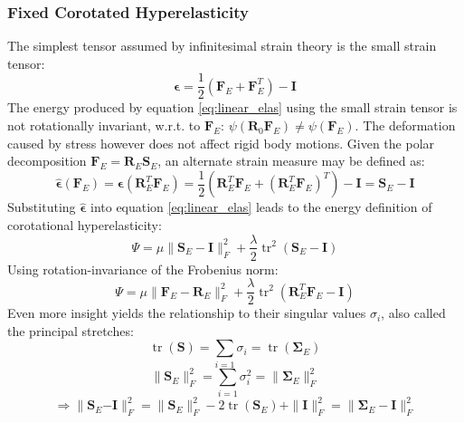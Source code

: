 \documentclass[m,times]{cgMA}
\begin{document}
\subsubsection{Fixed Corotated Hyperelasticity}
The simplest tensor assumed by infinitesimal strain theory is the small strain tensor: \begin{equation}
  \boldsymbol{\epsilon} = \frac { 1 } { 2 } \left( \mathbf { F }_E + \mathbf { F }_E ^ { T } \right) - \mathbf { I }
\end{equation}
The energy produced by equation \ref{eq:linear_elas} using the small strain tensor is not rotationally invariant, w.r.t. to $\mathbf{F}_E$: $\psi(\mathbf{R}_{0} \mathbf{F}_E) \neq \psi(\mathbf{F}_E)$. The deformation caused by stress however does not affect rigid body motions. Given the polar decomposition $\mathbf{F}_E = \mathbf{R}_E\mathbf{S}_E$, an alternate strain measure may be defined as:
\begin{equation}
  \hat { \boldsymbol { \epsilon } } ( \mathbf { F }_E ) = \boldsymbol { \epsilon } \left( \mathbf { R }_E ^ { T } \mathbf { F }_E \right) = \frac { 1 } { 2 } \left( \mathbf { R }_E ^ { T } \mathbf { F }_E + \left( \mathbf { R }_E ^ { T } \mathbf { F }_E \right) ^ { T } \right) - \mathbf { I } = \mathbf { S }_E - \mathbf { I }
\end{equation}
Substituting $\hat{\boldsymbol{\epsilon}}$ into equation \ref{eq:linear_elas} leads to the energy definition of corotational hyperelasticity:
\begin{equation}\label{eq:corot_S}
  \Psi = \mu \| \mathbf{ S }_E - \mathbf { I } \| _ { F } ^ { 2 } + \frac { \lambda } { 2 } \operatorname { tr } ^ { 2 } ( \mathbf { S }_E - \mathbf { I } )
\end{equation}
Using rotation-invariance of the Frobenius norm:
\begin{equation}
  \Psi = \mu \| \mathbf {F}_E  - \mathbf {R}_E \| _ { F } ^ { 2 } + \frac { \lambda } { 2 } \operatorname { tr } ^ { 2 } \left( \mathbf { R }_E ^ { T } \mathbf { F }_E - \mathbf { I } \right)
\end{equation}
Even more insight yields the relationship to their singular values $\sigma _ i$, also called the principal stretches:
$$\operatorname {tr}\left(\mathbf{S}\right) = \sum _ { i = 1 } \sigma _ { i } = \operatorname{tr}\left(\mathbf{\Sigma}_E\right)$$
$$\| \mathbf{S}_E \| _ { F }^2 = \sum _ { i = 1 } \sigma _ { i } ^ { 2 } = \| \mathbf{\Sigma}_E\|_{F}^2$$
$$\Rightarrow \| \mathbf{S}_E\mathbf{-I} \| _ { F }^2 = \|\mathbf{S}_E \| _ { F }^2 - 2 \operatorname{tr}(\mathbf{S}_E)  + \|\mathbf{I}\|_{F}^2 = \| \boldsymbol { \Sigma }_E - \mathbf { I } \| _ { F } ^ { 2 }$$
\end{document}
